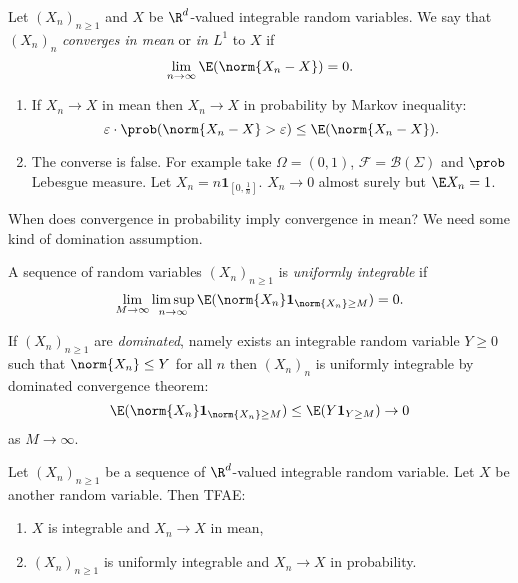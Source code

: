 \documentclass[a4paper]{article}
\renewcommand{\P}{\prob} %
\begin{document}
\begin{definition}
  Let \((X_n)_{n \geq 1}\) and \(X\) be \(\R^d\)-valued integrable random variables. We say that \((X_n)_n\) \emph{converges in mean} or \emph{in \(L^1\)} to \(X\) if
  \[
    \lim_{n \to \infty} \E(\norm{X_n - X}) = 0.
  \]
\end{definition}

\begin{remark}\leavevmode
  \begin{enumerate}
  \item If \(X_n \to X\) in mean then \(X_n \to X\) in probability by Markov inequality:
    \[
      \varepsilon \cdot \P(\norm{X_n - X} > \varepsilon) \leq \E(\norm{X_n - X}).
    \]
  \item The converse is false. For example take \(\Omega = (0, 1)\), \(\mathcal F = \mathcal B(\Sigma)\) and \(\P\) Lebesgue measure. Let \(X_n = n \mathbf 1_{[0, \frac{1}{n}]}\). \(X_n \to 0\) almost surely but \(\E X_n = 1\).
  \end{enumerate}
\end{remark}

When does convergence in probability imply convergence in mean? We need some kind of domination assumption.

\begin{definition}
  A sequence of random variables \((X_n)_{n \geq 1}\) is \emph{uniformly integrable} if
  \[
    \lim_{M \to \infty} \limsup_{n \to \infty} \E(\norm{X_n} \mathbf 1_{\norm{X_n} \geq M}) = 0.
  \]
\end{definition}

\begin{remark}
  If \((X_n)_{n \geq 1}\) are \emph{dominated}, namely exists an integrable random variable \(Y \geq 0\) such that \(\norm{X_n} \leq Y\) for all \(n\) then \((X_n)_n\) is uniformly integrable by dominated convergence theorem:
  \[
    \E(\norm{X_n} \mathbf 1_{\norm{X_n} \geq M}) \leq \E(Y \mathbf 1_{Y \geq M}) \to 0
  \]
  as \(M \to \infty\).
\end{remark}

\begin{theorem}
  Let \((X_n)_{n \geq 1}\) be a sequence of \(\R^d\)-valued integrable random variable. Let \(X\) be another random variable. Then TFAE:
  \begin{enumerate}
  \item \(X\) is integrable and \(X_n \to X\) in mean,
  \item \((X_n)_{n \geq 1}\) is uniformly integrable and \(X_n \to X\) in probability.
  \end{enumerate}
\end{theorem}
\end{document}
